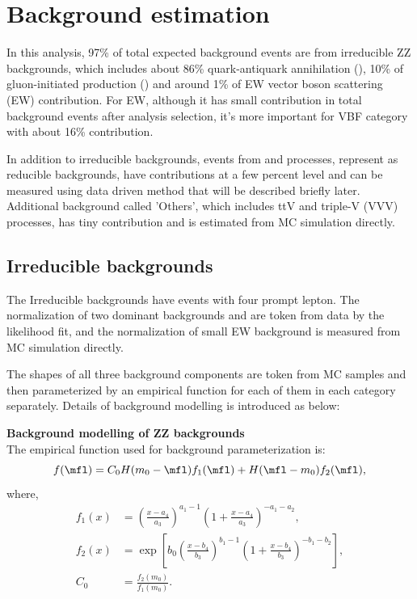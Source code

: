 \section{Background estimation}
\label{sec:hmhzz_bkg}

In this analysis, 97\% of total expected background events are from irreducible ZZ backgrounds, which includes about 86\% quark-antiquark annihilation (\qqZZ), 10\% of gluon-initiated production (\ggZZ) and around 1\% of EW vector boson scattering (\qqZZ EW) contribution.
For \qqZZ EW, although it has small contribution in total background events after analysis selection, it's more important for VBF category with about 16\% contribution.

In addition to irreducible backgrounds, events from \Zjet and \ttbar processes, represent as reducible backgrounds, have contributions at a few percent level and can be measured using data driven method that will be described briefly later.
Additional background called 'Others', which includes ttV and triple-V (VVV) processes, has tiny contribution and is estimated from MC simulation directly.

\subsection{Irreducible backgrounds}
The Irreducible backgrounds have events with four prompt lepton.
The normalization of two dominant backgrounds \qqZZ and \ggZZ are token from data by the likelihood fit, and the normalization of small \qqZZ EW background is measured from MC simulation directly.

The \mfl shapes of all three background components are token from MC samples and then parameterized by an empirical function for each of them in each category separately.
Details of background modelling is introduced as below:

\textbf{Background modelling of ZZ backgrounds} \\
The empirical function used for background parameterization is:
\begin{equation}
    f(\mfl) = C_0 H(m_{0} - \mfl) f_{1}(\mfl) + H(\mfl - m_{0}) f_{2}(\mfl),
    \label{eq:bkg_model}
\end{equation}
where,
\begin{align*}
    f_1(x) &= \left( \frac{x - a_4}{a_3} \right)^{a_1 - 1} \left( 1 + \frac{x - a_4}{a_3} \right)^{-a_1 - a_2}, \\
    f_2(x) &= \exp \left[ b_0 \left( \frac{x - b_4}{b_3} \right)^{b_1 - 1} \left( 1 + \frac{x - b_4}{b_3} \right)^{-b_1 - b_2} \right], \\
    C_0    &= \frac{f_{2} (m_0)} {f_{1} (m_0)}.
    \label{eq:bkg_model_full}
\end{align*}

